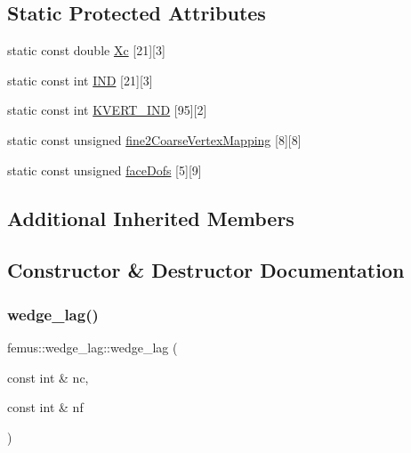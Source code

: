\subsection*{Static Protected Attributes}
\begin{DoxyCompactItemize}
\item 
static const double \mbox{\hyperlink{classfemus_1_1wedge__lag_a9423bba603878185de0ca70185455561}{Xc}} \mbox{[}21\mbox{]}\mbox{[}3\mbox{]}
\item 
static const int \mbox{\hyperlink{classfemus_1_1wedge__lag_a359875eed68f83c48e236d981f415eab}{I\+ND}} \mbox{[}21\mbox{]}\mbox{[}3\mbox{]}
\item 
static const int \mbox{\hyperlink{classfemus_1_1wedge__lag_a5addb93adf8823880876b5284adc560f}{K\+V\+E\+R\+T\+\_\+\+I\+ND}} \mbox{[}95\mbox{]}\mbox{[}2\mbox{]}
\item 
static const unsigned \mbox{\hyperlink{classfemus_1_1wedge__lag_a68a51b290864af934edbc7e66fe360e1}{fine2\+Coarse\+Vertex\+Mapping}} \mbox{[}8\mbox{]}\mbox{[}8\mbox{]}
\item 
static const unsigned \mbox{\hyperlink{classfemus_1_1wedge__lag_a6a6ecd3a809022a3e1e35a2081741c23}{face\+Dofs}} \mbox{[}5\mbox{]}\mbox{[}9\mbox{]}
\end{DoxyCompactItemize}
\subsection*{Additional Inherited Members}


\subsection{Constructor \& Destructor Documentation}
\mbox{\label{classfemus_1_1wedge__lag_a53d4803bd42f008dd251c5279482b81d}} 
\subsubsection{\texorpdfstring{wedge\+\_\+lag()}{wedge\_lag()}}
{\footnotesize\ttfamily femus\+::wedge\+\_\+lag\+::wedge\+\_\+lag (\begin{DoxyParamCaption}\item[{const int \&}]{nc,  }\item[{const int \&}]{nf }\end{DoxyParamCaption})\hspace{0.3cm}{\ttfamily [inline]}}



